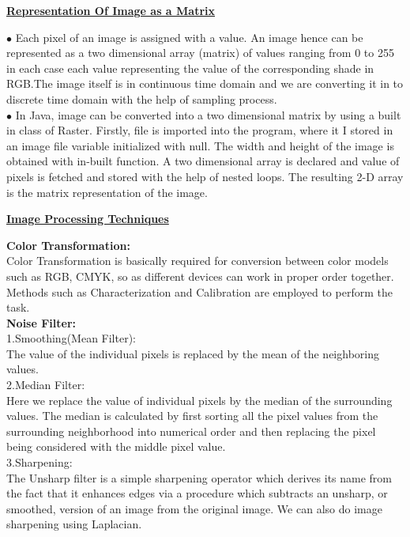 \documentclass[10pt,a4paper]{article}
\begin{document}
\begin{center}
\underline{\textbf{Representation Of Image as a Matrix}}\\
\end{center}
$\bullet$ Each pixel of an image is assigned with a value. An image hence can be represented as a two dimensional array (matrix) of values ranging from 0 to 255 in each case each value representing the value of the corresponding shade in RGB.The image itself is in continuous time domain and we are converting it in to discrete time domain with the help of sampling process.\\
$\bullet$ In Java, image can be converted into a two dimensional matrix by using a built in class of Raster. Firstly, file is imported into the program, where it I stored in an image file variable initialized with null. The width and height of the image is obtained with in-built function. A two dimensional array is declared and value of pixels is fetched and stored with the help of nested loops. The resulting 2-D array is the matrix representation of the image. 
\begin{center}
\underline{\textbf{Image Processing Techniques}}\\
\end{center}
\textbf{Color Transformation:}\\
Color Transformation is basically required for conversion between color models such as RGB, CMYK, so as different devices can work in proper order together. Methods such as Characterization and Calibration are employed to perform the task.\\
\textbf{Noise Filter:}\\
1.Smoothing(Mean Filter):\\
The value of the individual pixels is replaced by the mean of the neighboring values.\\
2.Median Filter:\\
Here we replace the value of individual pixels by the median of the surrounding values.  The median is calculated by first sorting all the pixel values from the surrounding neighborhood into numerical order and then replacing the pixel being considered with the middle pixel value.\\
3.Sharpening:\\
The Unsharp filter is a simple  sharpening operator which derives its name from the fact that it  enhances edges via a procedure which subtracts an unsharp, or smoothed, version of an image from the original image. We can also do image sharpening using Laplacian.\\
\end{document}
